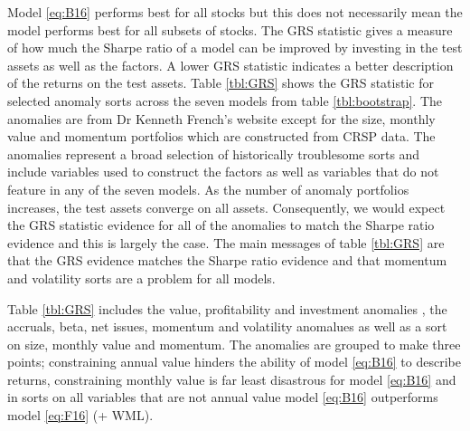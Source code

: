 

Model \ref{eq:B16} performs best for all stocks but this does not necessarily
mean the model performs best for all subsets of stocks.
The GRS statistic gives a measure of how much the Sharpe ratio of a model can
be improved by investing in the test assets as well as the factors.
A lower GRS statistic indicates a better description of the returns on the
test assets.
Table \ref{tbl:GRS} shows the GRS statistic for selected anomaly sorts across
the seven models from table \ref{tbl:bootstrap}.
The anomalies are from Dr Kenneth French's website except for the size, monthly
value and momentum  portfolios which are constructed from CRSP data.
The anomalies represent a broad selection of historically troublesome sorts and
include variables used to construct the factors as well as variables that do
not feature in any of the seven models.
As the number of anomaly portfolios increases, the test assets converge on
all assets.
Consequently, we would expect the GRS statistic evidence for all of the
anomalies to match the Sharpe ratio evidence and this is largely the case.
The main messages of table \ref{tbl:GRS} are that the GRS evidence matches the
Sharpe ratio evidence and that momentum and volatility sorts are a problem for
all models.

Table \ref{tbl:GRS} includes the value, profitability and investment anomalies
\parencite{fama2006profitability, fama2015five},
the accruals, beta, net issues, momentum and volatility anomalues
\parencite{fama2016dissecting} as well as a sort on size, monthly value and
momentum.
The anomalies are grouped to make three points;
constraining annual value hinders the ability of model \ref{eq:B16} to describe
returns,
constraining monthly value is far least disastrous for model \ref{eq:B16} and
in sorts on all variables that are not annual value
model \ref{eq:B16} outperforms model \ref{eq:F16} (+ WML).

